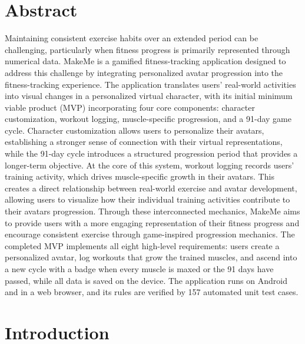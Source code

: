 \documentclass[11pt]{article}
\begin{document}
\section{Abstract}
Maintaining consistent exercise habits over an extended period can be challenging,
particularly when fitness progress is primarily represented through numerical data.
MakeMe is a gamified fitness-tracking application designed to address this challenge by
integrating personalized avatar progression into the fitness-tracking experience.
The application translates users' real-world activities into visual changes in a personalized
virtual character, with its initial minimum viable product (MVP) incorporating four core
components: character customization, workout logging, muscle-specific progression,
and a 91-day game cycle. Character customization allows users to personalize their avatars,
establishing a stronger sense of connection with their virtual representations,
while the 91-day cycle introduces a structured progression period that provides a longer-term
objective. At the core of this system, workout logging records users' training activity,
which drives muscle-specific growth in their avatars. This creates a direct relationship
between real-world exercise and avatar development, allowing users to visualize
how their individual training activities contribute to their avatars progression.
Through these interconnected mechanics, MakeMe aims to provide users with a more engaging
representation of their fitness progress and encourage consistent exercise through
game-inspired progression mechanics. The completed MVP implements all eight high-level requirements:
users create a personalized avatar, log workouts that grow the trained muscles, and ascend into a new
cycle with a badge when every muscle is maxed or the 91 days have passed, while all data is saved on the
device. The application runs on Android and in a web browser, and its rules are verified by 157 automated
unit test cases.



\section{Introduction}
\end{document}
